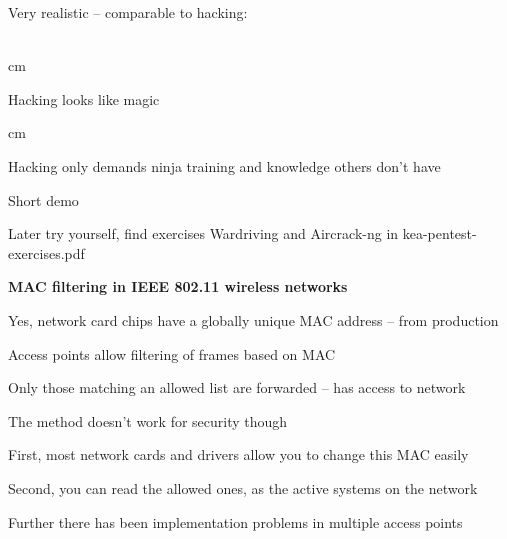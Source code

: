 \documentclass[Screen16to9,17pt]{foils}
\begin{document}

Very realistic -- comparable to hacking:\\
\\





 cm

\centerline{Hacking looks like magic}




 cm
\centerline{Hacking only demands ninja training and knowledge others don't have}




\begin{list2}
\item Short demo
\item Later try yourself, find exercises Wardriving and Aircrack-ng in kea-pentest-exercises.pdf
\end{list2}



{\bf MAC filtering in IEEE 802.11 wireless networks}
\begin{list2}
\item Yes, network card chips have a globally unique MAC address -- from production
\item Access points allow filtering of frames based on MAC
\item Only those matching an allowed list are forwarded -- has access to network
\item The method doesn't work for security though \smiley
\item First, most network cards and drivers allow you to change this MAC easily
\item Second, you can read the allowed ones, as the active systems on the network
\item Further there has been implementation problems in multiple access points
\end{list2}

\end{document}
